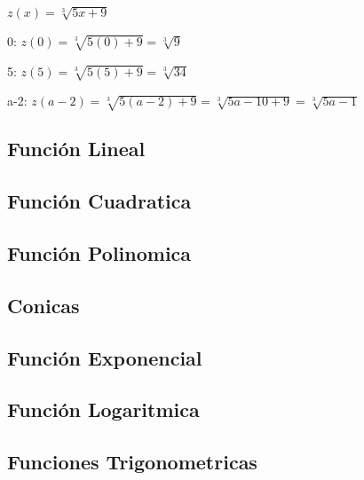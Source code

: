     $ z(x) = \sqrt[3]{5x+9}  $

    0:    $ z(0) = \sqrt[3]{5(0)+9}= \sqrt[3]{9}  $

    5:    $ z(5) = \sqrt[3]{5(5)+9}= \sqrt[3]{34}  $

    a-2:    $ z(a-2) = \sqrt[3]{5(a-2)+9}   = \sqrt[3]{5a-10+9} = \sqrt[3]{5a-1}$

\subsection{Función Lineal}
\subsection{Función Cuadratica}
\subsection{Función Polinomica}
\subsection{Conicas}
\subsection{Función Exponencial}
\subsection{Función Logaritmica}
\subsection{Funciones Trigonometricas}


